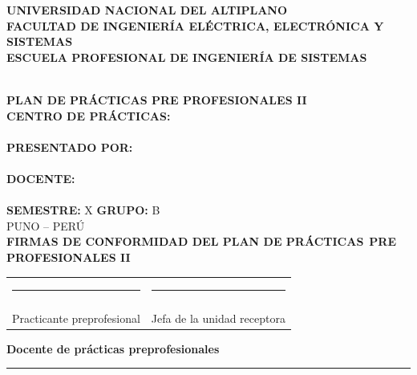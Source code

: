 \documentclass[12pt,a4paper]{article}
\begin{document}
\begin{titlepage}
\centering
\thispagestyle{empty}

{\Large\textbf{UNIVERSIDAD NACIONAL DEL ALTIPLANO}}\\[0.35cm]
{\large\textbf{FACULTAD DE INGENIERÍA ELÉCTRICA, ELECTRÓNICA Y SISTEMAS}}\\[0.35cm]
{\large\textbf{ESCUELA PROFESIONAL DE INGENIERÍA DE SISTEMAS}}\\[1.4cm]

\\[1.2cm]

{\Large\textbf{PLAN DE PRÁCTICAS PRE PROFESIONALES II}}\\[1.5cm]
{\large\textbf{CENTRO DE PRÁCTICAS:}}\\[0.2cm]
{\large \InstitucionNombre}\\[0.9cm]
{\large\textbf{PRESENTADO POR:}}\\[0.2cm]
{\large \PracticanteNombre}\\[0.9cm]
{\large\textbf{DOCENTE:}}\\[0.2cm]
{\large \Precidente}\\[0.9cm]
{\large\textbf{SEMESTRE:} X \hspace{1.5cm} \textbf{GRUPO:} B}\\[1.2cm]

{\large PUNO -- PERÚ}\\[1.5cm]

\textbf{FIRMAS DE CONFORMIDAD DEL PLAN DE PRÁCTICAS}\
\textbf{PRE PROFESIONALES II}\\[1cm]

\begin{tabular}{>{\centering\arraybackslash}p{}>{\centering\arraybackslash}p{}}
\rule{5cm}{0.4pt} & \rule{5cm}{0.4pt}\\
\PracticanteNombre & \InstitucionJefa\\
Practicante preprofesional & Jefa de la unidad receptora
\end{tabular}

\vfill
\textbf{Docente de prácticas preprofesionales}\\[0.7cm]
\rule{6cm}{0.4pt}\\
\Precidente
\end{titlepage}
\end{document}
